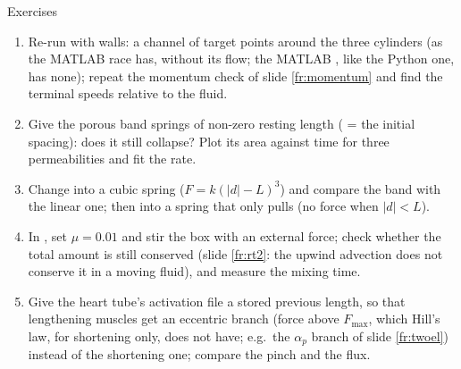\documentclass[aspectratio=169,11pt]{beamer}
\begin{document}
\begin{frame}{Exercises}
\label{fr:exercises}
\small
\begin{enumerate}
  \item Re-run  with walls: a channel of target points around the three cylinders (as the MATLAB  race has, without its flow; the MATLAB , like the Python one, has none); repeat the momentum check of slide \ref{fr:momentum} and find the terminal speeds relative to the fluid.
  \item Give the porous band springs of non-zero resting length ( = the initial spacing): does it still collapse? Plot its area against time for three permeabilities and fit the rate.
  \item Change  into a cubic spring ($F = k(|d| - L)^3$) and compare the band with the linear one; then into a spring that only pulls (no force when $|d| < L$).
  \item In , set $\mu = 0.01$ and stir the box with an external force; check whether the total amount is still conserved (slide \ref{fr:rt2}: the upwind advection does not conserve it in a moving fluid), and measure the mixing time.
  \item Give the heart tube's activation file a stored previous length, so that lengthening muscles get an eccentric branch (force above $F_{\max}$, which Hill's law, for shortening only, does not have; e.g.\ the $\alpha_p$ branch of slide \ref{fr:twoel}) instead of the shortening one; compare the pinch and the flux.
\end{enumerate}
\end{frame}
\end{document}
